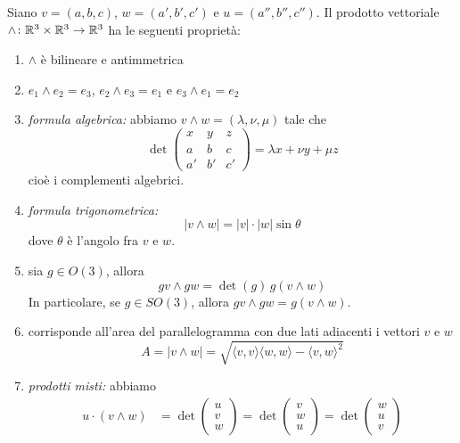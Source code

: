 \documentclass[a4paper]{article}
\begin{document}
\begin{snippetproposition}{}
    Siano \(v = (a,b,c)\), \(w = (a', b', c')\) e \(u = (a'', b'', c'')\).
    Il prodotto vettoriale \(\wedge \colon \mathbb{R}^3 \times \mathbb{R}^3 \to \mathbb{R}^3\)
    ha le seguenti proprietà:
    \begin{enumerate}
        \item \(\wedge\) è bilineare e antimmetrica
        \item \(e_1 \wedge e_2 = e_3\), \(e_2 \wedge e_3 = e_1\)
        e \(e_3 \wedge e_1 = e_2\) %
        \item \emph{formula algebrica:}
        abbiamo \(v \wedge w = (\lambda, \nu, \mu)\) tale che
        \[
            \det \begin{pmatrix}
                x & y & z \\
                a & b & c \\
                a' & b' & c'
            \end{pmatrix} = \lambda x + \nu y + \mu z
        \]
        cioè i complementi algebrici.
        \item \emph{formula trigonometrica:}
        \[
            |v \wedge w| = |v| \cdot |w| \sin \theta
        \]
        dove \(\theta\) è l'angolo fra \(v\) e \(w\).
        \item sia \(g \in O(3)\), allora
        \[
            gv \wedge gw = \det(g)\,g(v \wedge w)
        \]
        In particolare, se \(g \in SO(3)\), allora \(gv \wedge gw = g(v \wedge w)\).
        \item corrisponde all'area del parallelogramma con due lati adiacenti
        i vettori \(v\) e \(w\)
        \[
            A = |v \wedge w| = \sqrt{
                \langle v,v\rangle
                \langle w,w\rangle - \langle v,w\rangle^2
            }
        \]
        \item \emph{prodotti misti:}
        abbiamo \begin{align*}
            u \cdot (v \wedge w) &= \det\begin{pmatrix}u \\ v \\ w\end{pmatrix}
            = \det\begin{pmatrix}v \\ w \\ u\end{pmatrix}
            = \det\begin{pmatrix}w \\ u \\ v\end{pmatrix}

\end{align*}
\end{enumerate}
\end{snippetproposition}
\end{document}
